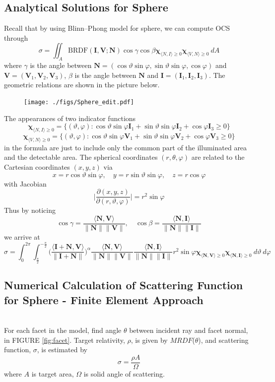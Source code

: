 \documentclass[11pt]{amsart}
\newcommand{\BRDF}{\mathrm{BRDF}}
\newcommand{\ip}[2]{\langle {#1}, {#2} \rangle}
\theoremstyle{definition}
\begin{document}
\subsection{Analytical Solutions for Sphere}
Recall that by using Blinn--Phong model for sphere, we can compute OCS through
$$\sigma =\iint_{A}\BRDF(\mathbf{I},\mathbf{V};\mathbf{N}) \cos\gamma \cos\beta \mathbf{\chi}_{\ip{N}{I}\geq 0}\mathbf{\chi}_{\ip{V}{N}\geq 0} \: dA$$
where $\gamma$ is the angle between $\mathbf{N}=(\cos\vartheta\sin\varphi,\sin\vartheta\sin\varphi,\cos\varphi)$ and  $\mathbf{V}=(\mathbf{V}_1,\mathbf{V}_2,\mathbf{V}_3)$,  $\beta$ is the angle between $\mathbf{N}$ and $\mathbf{I}=(\mathbf{I}_1,\mathbf{I}_2,\mathbf{I}_3)$. The geometric relations are shown in the picture below.

\begin{figure}[h!]
  \texttt{[image: ./figs/Sphere\_edit.pdf]}
  \label{fig:sphere}
\end{figure}
The appearances of two indicator functions 
$$\mathbf{\chi}_{\ip{N}{I}\geq 0}=\{(\vartheta,\varphi):\cos\vartheta\sin\varphi\mathbf{I}_1+\sin\vartheta\sin\varphi\mathbf{I}_2+\cos\varphi\mathbf{I}_3\geq 0\}$$ 
$$\mathbf{\chi}_{\ip{V}{N}\geq 0}=\{(\vartheta,\varphi): \cos\vartheta\sin\varphi\mathbf{V}_1+\sin\vartheta\sin\varphi\mathbf{V}_2+\cos\varphi\mathbf{V}_3\geq 0\}$$ 
in the formula are just to include only the common part of the illuminated area and the detectable area.
The spherical coordinates $(r,\theta,\varphi)$ are related to the Cartesian coordinates $(x,y,z)$ via
$$x =r\cos\vartheta \sin\varphi, \quad y=r\sin\vartheta \sin\varphi, \quad z=r\cos\varphi $$
with Jacobian 
$$\bigg|\frac{\partial(x,y,z)}{\partial(r,\vartheta,\varphi)}\bigg|= r^2 \sin\varphi $$
Thus by noticing 
$$\cos\gamma =\frac{\ip{\mathbf{N}}{\mathbf{V}}}{\|\mathbf{N}\| \|\mathbf{V}\|},\quad \cos\beta=\frac{\ip{\mathbf{N}}{\mathbf{I}}}{\|\mathbf{N}\| \|\mathbf{I}\|}$$
we arrive at
  $$\sigma =\int_{0}^{2\pi}\int_{\frac{\pi}{2}}^{-\frac{\pi}{2}}\Bigg(\frac{\ip{\mathbf{I}+\mathbf{N}}{\mathbf{V}}}{\|\mathbf{I}+\mathbf{N}\|}\Bigg)^\alpha\frac{\ip{\mathbf{N}}{\mathbf{V}}}{\|\mathbf{N}\| \|\mathbf{V}\|}\frac{\ip{\mathbf{N}}{\mathbf{I}}}{\|\mathbf{N}\| \|\mathbf{I}\|}r^2\sin\varphi\mathbf{\chi}_{\ip{\mathbf{N}}{\mathbf{V}}\geq 0}\mathbf{\chi}_{\ip{\mathbf{N}}{\mathbf{I}}\geq 0} \: d\vartheta \: d\varphi$$
  
\subsection{Numerical Calculation of Scattering Function for Sphere - Finite Element Approach}~\\
For each facet in the model, find angle $\theta$ between incident ray and facet normal, in FIGURE \ref{fig:facet}. Target relativity, $\rho$, is given by $MRDF$($\theta$), and scattering function, $\sigma$, is estimated by
\begin{equation}
\sigma =\frac{\rho A}{\Omega}
\end{equation} 
where $A$ is target area, $\Omega$ is solid angle of scattering.
\end{document}
